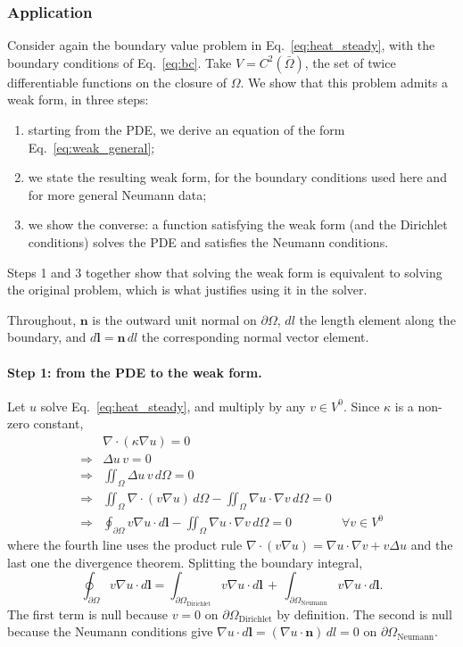 \documentclass{article}
\makeatletter
\providecommand\FloatBarrier{\par\begingroup\let\@elt\relax
  \edef\@tempa{\@botlist\@deferlist\@dbldeferlist}%
  \ifx\@tempa\@empty\else\clearpage\fi\endgroup}
\newcommand{\tmop}[1]{\ensuremath{\operatorname{#1}}}
\newenvironment{enumeratenumeric}{\begin{enumerate}[1.] }{\end{enumerate}}
\makeatother
\begin{document}
\FloatBarrier
\subsubsection{Application }
\label{sec:application}

Consider again the boundary value problem in Eq.~\eqref{eq:heat_steady}, with the
boundary conditions of Eq.~\eqref{eq:bc}. Take $V = C^2 (\bar{\Omega})$, the set of
twice differentiable functions on the closure of $\Omega$. We show that this
problem admits a weak form, in three steps:
\begin{enumeratenumeric}
  \item starting from the PDE, we derive an equation of the form
  Eq.~\eqref{eq:weak_general};
  \item we state the resulting weak form, for the boundary conditions used here
  and for more general Neumann data;
  \item we show the converse: a function satisfying the weak form (and the
  Dirichlet conditions) solves the PDE and satisfies the Neumann conditions.
\end{enumeratenumeric}
Steps 1 and 3 together show that solving the weak form is equivalent to solving
the original problem, which is what justifies using it in the solver.

Throughout, $\mathbf{n}$ is the outward unit normal on $\partial\Omega$, $dl$ the
length element along the boundary, and $d\mathbf{l} = \mathbf{n}\, dl$ the
corresponding normal vector element.

\paragraph{Step 1: from the PDE to the weak form.} Let $u$ solve
Eq.~\eqref{eq:heat_steady}, and multiply by any $v \in V^0$. Since $\kappa$ is a
non-zero constant,
\begin{eqnarray*}
  & \nabla \cdot (\kappa \nabla u) = 0 &  \\
  \Rightarrow & \Delta u \, v = 0 &  \\
  \Rightarrow & \displaystyle\iint_{\Omega} \Delta u \, v \, d\Omega = 0 &  \\
  \Rightarrow & \displaystyle\iint_{\Omega} \nabla \cdot (v \nabla u) \, d\Omega - \iint_{\Omega}
  \nabla u \cdot \nabla v \, d\Omega = 0 &  \\
  \Rightarrow & \displaystyle\oint_{\partial \Omega} v \nabla u \cdot d\mathbf{l} -
  \iint_{\Omega} \nabla u \cdot \nabla v \, d\Omega = 0 & \forall v \in V^0
\end{eqnarray*}
where the fourth line uses the product rule $\nabla \cdot (v \nabla u) = \nabla u
\cdot \nabla v + v \Delta u$ and the last one the divergence theorem. Splitting
the boundary integral,
\[ \oint_{\partial \Omega} v \nabla u \cdot d\mathbf{l} = \int_{\partial
   \Omega_{\tmop{Dirichlet}}} v \nabla u \cdot d\mathbf{l} \, + \, \int_{\partial
   \Omega_{\tmop{Neumann}}} v \nabla u \cdot d\mathbf{l} . \]
The first term is null because $v = 0$ on $\partial \Omega_{\tmop{Dirichlet}}$ by definition.
The second is null because the Neumann conditions give $\nabla u \cdot d\mathbf{l}
= (\nabla u \cdot \mathbf{n}) \, dl = 0$ on $\partial \Omega_{\tmop{Neumann}}$.
\end{document}
